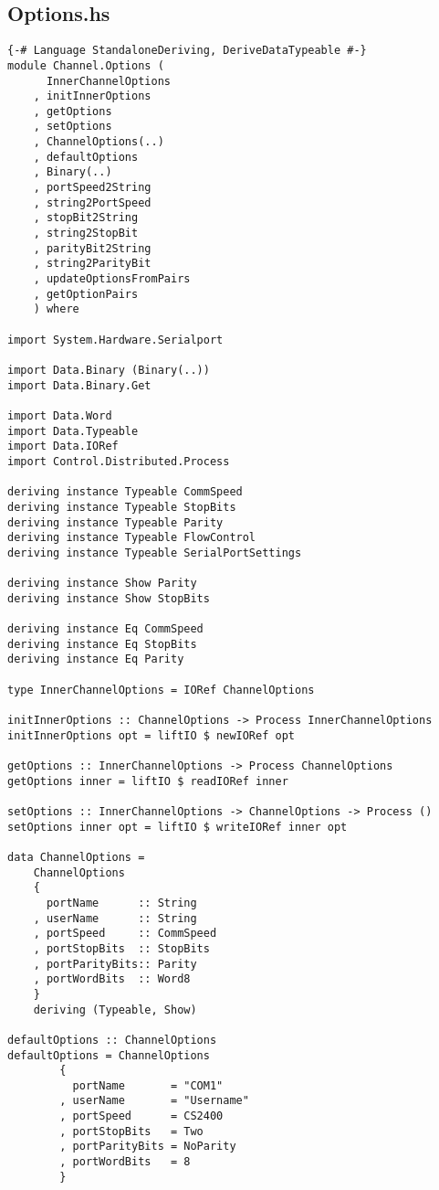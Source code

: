 \documentclass[russian,utf8,simple,emptystyle]{eskdtext}
\begin{document}
\subsection{Options.hs}
\begin{lstlisting}
{-# Language StandaloneDeriving, DeriveDataTypeable #-}
module Channel.Options (
      InnerChannelOptions
    , initInnerOptions
    , getOptions
    , setOptions
    , ChannelOptions(..)
    , defaultOptions
    , Binary(..)
    , portSpeed2String
    , string2PortSpeed
    , stopBit2String
    , string2StopBit
    , parityBit2String
    , string2ParityBit
    , updateOptionsFromPairs
    , getOptionPairs
    ) where 

import System.Hardware.Serialport

import Data.Binary (Binary(..))
import Data.Binary.Get

import Data.Word
import Data.Typeable
import Data.IORef
import Control.Distributed.Process

deriving instance Typeable CommSpeed
deriving instance Typeable StopBits
deriving instance Typeable Parity 
deriving instance Typeable FlowControl
deriving instance Typeable SerialPortSettings

deriving instance Show Parity 
deriving instance Show StopBits 

deriving instance Eq CommSpeed 
deriving instance Eq StopBits 
deriving instance Eq Parity 

type InnerChannelOptions = IORef ChannelOptions

initInnerOptions :: ChannelOptions -> Process InnerChannelOptions
initInnerOptions opt = liftIO $ newIORef opt 

getOptions :: InnerChannelOptions -> Process ChannelOptions
getOptions inner = liftIO $ readIORef inner 

setOptions :: InnerChannelOptions -> ChannelOptions -> Process ()
setOptions inner opt = liftIO $ writeIORef inner opt 

data ChannelOptions =
    ChannelOptions 
    {
      portName      :: String
    , userName      :: String
    , portSpeed     :: CommSpeed
    , portStopBits  :: StopBits  
    , portParityBits:: Parity
    , portWordBits  :: Word8
    }
    deriving (Typeable, Show)
    
defaultOptions :: ChannelOptions
defaultOptions = ChannelOptions
        {
          portName       = "COM1"
        , userName       = "Username"
        , portSpeed      = CS2400
        , portStopBits   = Two
        , portParityBits = NoParity 
        , portWordBits   = 8
        }


\end{lstlisting}
\end{document}
